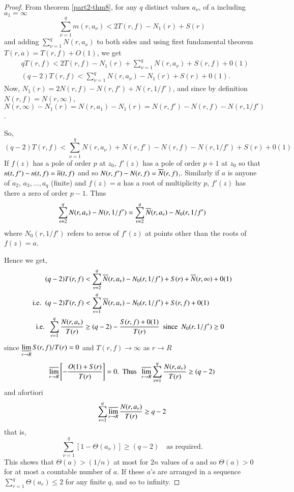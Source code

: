 \begin{proof}
From theorem \ref{part2-thm8}, for any $q$ distinct values $a_{\nu}$, of a
including $a_{1}=\infty$
$$
\sum^{q}_{\nu=1}m(r,a_{\nu})<2T(r,f)-N_{1}(r)+S(r)
$$
and adding $\sum\limits^{q}_{\nu=1}N(r,a_{\nu})$ to both sides and
using first fundamental theorem $T(r,a)=T(r,f)+O(1)$, we get
\begin{align*}
& qT(r,f)<2T(r,f)-N_{1}(r)+\sum\limits^q_{\nu=1}N(r,a_{\nu})+S(r,f)+0(1)\\
& (q-2)T(r,f)<\sum^{q}_{\nu=1}N(r,a_{\nu}) - N_{1}(r)+S(r)+0(1).
\end{align*}
Now, $N_{1}(r)=2N(r,f)-N(r,f')+N(r,1/f')$, and since by definition
$N(r,f)=N(r,\infty)$,
$N(r,\infty)-N_{1}(r)=N(r,a_{1})-N_{1}(r)=N(r,f')-N(r,f)-N(r,1/f')$.

So,\pageoriginale
$$
(q-2)T(r,f)<\sum^{q}_{\nu=1}N(r,a_{\nu})+N(r,f')-N(r,f)-N(r,1/f')+S(r)+0(1)
$$
If $f(z)$ has a pole of order $p$ at $z_{0}$, $f'(z)$ has a pole of
order $p+1$ at $z_{0}$ so that $n(t,f')-n(t,f)=\overline{n}(t,f)$ and so
$N(r,f')-N(r,f)=\overline{N}(r,f)$,. Similarly if $a$ is anyone of $a_{2}$,
$a_{3},\ldots , a_{q}$ (finite) and $f(z)=a$ has a root of multiplicity
$p$, $f'(z)$ has there a zero of order $p-1$. Thus
$$
\sum^{q}_{\nu=2}N(r,a_{\nu})-N(r,1/f')=\sum^{q}_{\nu=2}\overline{N}(r,a_{\nu})-N_{0}(r,1/f') 
$$
where $N_{0}(r,1/f')$ refers to zeros of $f'(z)$ at points other than
the roots of $f(z)=a$.

Hence we get,
\begin{align*}
(q-2)T(r,f) &<
  \sum^{q}_{\nu=2}\overline{N}(r,a_{\nu})-N_{0}(r,1/f')+S(r)+\overline{N}(r,\infty)+0(1)\\
\text{{i.e.}\kern.3em\ } (q-2)T(r,f) &<
\sum^{q}_{\nu=1}\overline{N}(r,a_{\nu})-N_{0}(r,1/f')+S(r,f)+0(1)\\
\text{{i.e.}\kern.3em\ } \sum^{q}_{\nu=1}\frac{N(r,a_{\nu})}{T(r)} &\geq
(q-2)-\frac{S(r,f)+0(1)}{T(r)}\text{ \ since \ } N_{0}(r,1/f')\geq 0
\end{align*}
since $\mathop{\underline{\lim}}\limits_{r\to R}S(r,f)/T(r)=0$ and $T(r,f)\to
\infty$ as $r\to R$ 
$$
\mathop{\overline{\lim}}\limits_{r\to
  R}\left[-\frac{O(1)+S(r)}{T(r)}\right]=0. \text{ \ Thus \ }
\mathop{\overline{\lim}}\limits_{r\to
  R}\sum^{q}_{\nu=1}\frac{N(r,a_{\nu})}{T(r)}\geq (q-2)
$$
and afortiori 
$$
\sum^{q}_{\nu=1}\mathop{\overline{\lim}}\limits_{r\to R}\frac{N(r,a_{\nu})}{T(r)}\geq q-2 
$$\pageoriginale
that is,
$$
\sum^{q}_{\nu=1}[1-\Theta(a_{\nu})]\geq (q-2)\quad\text{as required.}
$$
This shows that $\Theta(a)>(1/n)$ at most for $2n$ values of $a$ and
so $\Theta(a)>0$ for at most a countable number of $a$. If these $a$'s
are arranged in a sequence $\sum\limits^{q}_{r=1}\Theta(a_{r})\leq 2$
for any finite $q$, and so to infinity. 
\end{proof}

